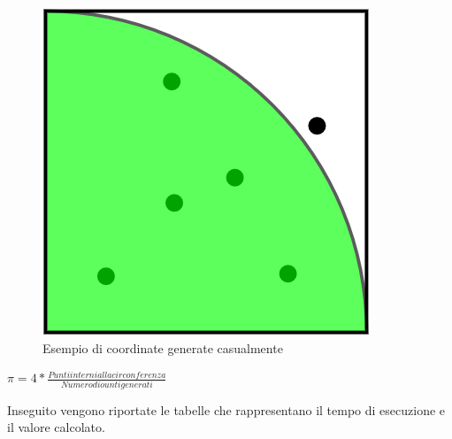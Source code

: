 \documentclass[12pt,a4paper]{report}
\begin{document}
\begin{figure}[h]
\centering
\includegraphics[scale=0.3]{Img/qCirc.png}
\caption{Esempio di coordinate generate casualmente}
\end{figure}

\begin{center}
$ \pi = 4 * \frac{Punti interni alla circonferenza}{Numero di ounti generati} $ 
\end{center}


	

Inseguito vengono riportate le tabelle che rappresentano il tempo di esecuzione e il valore calcolato.
\end{document}
